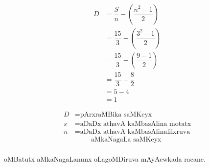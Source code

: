\begin{minipage}[t]{3cm}
\begin{align*}
D &= \dfrac{S}{n}-\left(\dfrac{n^2-1}{2} \right)\\
& =\dfrac{15}{3}- \left(\dfrac{3^2-1}{2} \right)\\
& =\dfrac{15}{3}-\left(\dfrac{9-1}{2} \right)\\
& =\dfrac{15}{3}-\dfrac{8}{2}\\
& =5-4\\
&=1
\end{align*}
\end{minipage}
\begin{minipage}[t]{5cm}
\begin{align*}
D & = \text{pArxraMBika saMKeyx}\\
s & = \text{aDaDx athavA kaMbasAlina motatx}\\
n & = \text{aDaDx athavA kaMbasAlinalilxruva}\\
& \hspace{1cm} \text{aMkaNagaLa saMKeyx}\\[30pt]
\end{align*}
\end{minipage}

oMBatutx aMkaNagaLanunx oLagoMDiruva mAyAcwkada racane.

